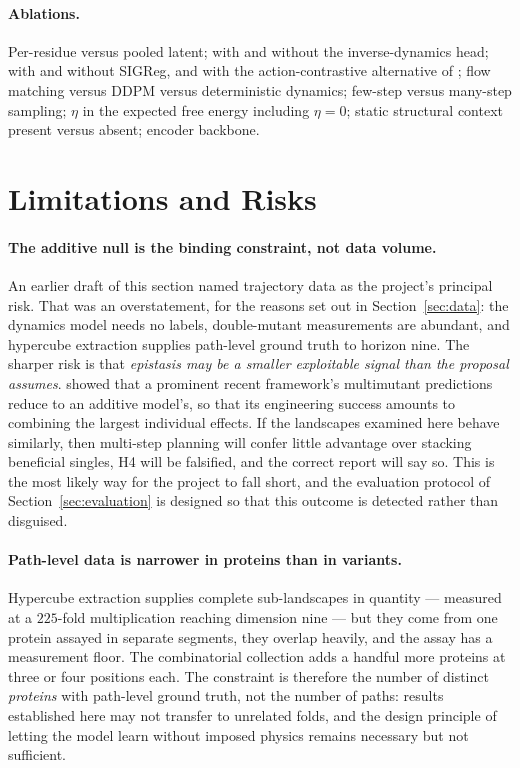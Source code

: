 \documentclass[12pt, a4paper]{article}
\begin{document}
\paragraph{Ablations.} Per-residue versus pooled latent; with and without the inverse-dynamics head; with and without SIGReg, and with the action-contrastive alternative of \citet{boylan2026nogaussian}; flow matching versus DDPM versus deterministic dynamics; few-step versus many-step sampling; $\eta$ in the expected free energy including $\eta = 0$; static structural context present versus absent; encoder backbone.

\section{Limitations and Risks}
\label{sec:limitations}

\paragraph{The additive null is the binding constraint, not data volume.} An earlier draft of this section named trajectory data as the project's principal risk. That was an overstatement, for the reasons set out in Section~\ref{sec:data}: the dynamics model needs no labels, double-mutant measurements are abundant, and hypercube extraction supplies path-level ground truth to horizon nine. The sharper risk is that \textit{epistasis may be a smaller exploitable signal than the proposal assumes}. \citet{visani2026additive} showed that a prominent recent framework's multimutant predictions reduce to an additive model's, so that its engineering success amounts to combining the largest individual effects. If the landscapes examined here behave similarly, then multi-step planning will confer little advantage over stacking beneficial singles, H4 will be falsified, and the correct report will say so. This is the most likely way for the project to fall short, and the evaluation protocol of Section~\ref{sec:evaluation} is designed so that this outcome is detected rather than disguised.

\paragraph{Path-level data is narrower in proteins than in variants.} Hypercube extraction supplies complete sub-landscapes in quantity --- measured at a $225$-fold multiplication reaching dimension nine --- but they come from one protein assayed in separate segments, they overlap heavily, and the assay has a measurement floor. The combinatorial collection adds a handful more proteins at three or four positions each. The constraint is therefore the number of distinct \textit{proteins} with path-level ground truth, not the number of paths: results established here may not transfer to unrelated folds, and the design principle of letting the model learn without imposed physics remains necessary but not sufficient.
\end{document}
